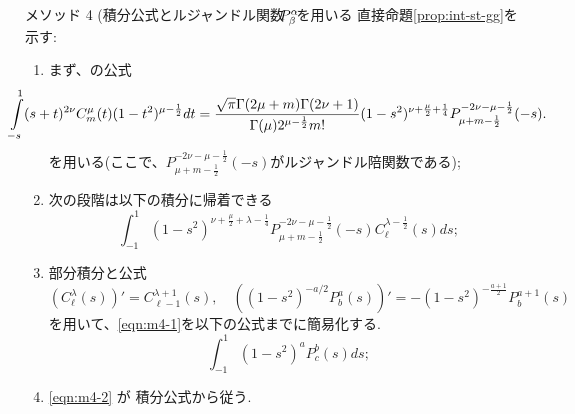 \documentclass[pdf,notes]{beamer}
\begin{document}
\begin{frame}{メソッド 4 (積分公式とルジャンドル関数$\kern-0.1cm P^\alpha_\beta\kern-0.1cm$を用いる}
	\scriptsize
	直接命題\ref{prop:int-st-gg}を示す:
	\begin{enumerate}
		\item まず、\cite[7.4.11]{kobayashi2011schrodinger}の公式
			{
				\scriptsize
			\begin{equation*}
				\kern-1cm\int_{-s}^1(s+t)^{2\nu} {C}_m^\mu(t)(1-t^2)^{\mu-\frac{1}{2}}dt=
				\frac{\sqrt{\pi}\Gamma(2\mu+m)\Gamma(2\nu+1)}{\Gamma(\mu)2^{\mu-\frac{1}{2}}m!}
				(1-s^2)^{\nu+\frac{\mu}{2}+\frac{1}{4}}P_{\mu+m-\frac{1}{2}}^{-2\nu-\mu-\frac{1}{2}}(-s).
			\end{equation*}
		}
		を用いる(ここで、$P_{\mu+m-\frac{1}{2}}^{-2\nu-\mu-\frac{1}{2}}(-s)$がルジャンドル陪関数である);
		\item 次の段階は以下の積分に帰着できる
			\begin{equation}\label{eqn:m4-1}
				\int_{-1}^1(1-s^2)^{\nu+\frac{\mu}{2}+\lambda-\frac{1}{4}}P_{\mu+m-\frac{1}{2}}^{-2\nu-\mu-\frac{1}{2}}(-s)C^{\lambda-\frac{1}{2}}_\ell(s)ds;
			\end{equation}
			\vspace{-0.4cm}
		\item 部分積分と公式
			\begin{equation*}
				\left(C^\lambda_\ell(s)  \right)'=C^{\lambda+1}_{\ell-1}(s),\quad\left((1-s^2)^{-a/2}P^a_b(s) \right)'
			=-(1-s^2)^{-\frac{a+1}{2}}P_b^{a+1}(s)
			\end{equation*}
			を用いて、\eqref{eqn:m4-1}を以下の公式までに簡易化する.
			\begin{equation}\label{eqn:m4-2}
				\int_{-1}^1(1-s^2)^aP^b_c(s)ds;
			\end{equation}
			\vspace{-0.4cm}
		\item \eqref{eqn:m4-2} が \cite[L2]{kobayashi2011schrodinger}積分公式から従う.
	\end{enumerate}
\end{frame}
\end{document}
